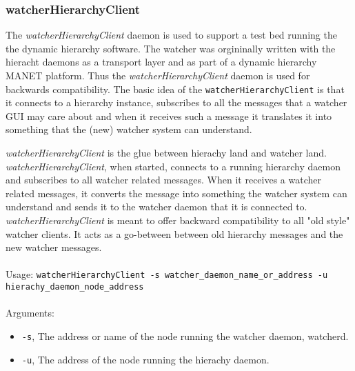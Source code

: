 \subsubsection{watcherHierarchyClient}
\label{watcherHierarchyClient}

The {\it watcherHierarchyClient} daemon is used to support a test bed running the the dynamic hierarchy software. 
The watcher was orgininally written with the hieracht daemons as a transport layer and as part of a 
dynamic hierarchy MANET platform. Thus the {\it watcherHierarchyClient} daemon is used for backwards compatibility. 
The basic idea of the {\tt watcherHierarchyClient} is that it connects to a hierarchy instance, subscribes
to all the messages that a watcher GUI may care about and when it receives such a message it translates it 
into something that the (new) watcher system can understand. 

{\it watcherHierarchyClient} is the glue between hierachy land and watcher land. {\it watcherHierarchyClient}, when started, connects
to a running hierarchy daemon and subscribes to all watcher related messages. When it receives a watcher related
messages, it converts the message into something the watcher system can understand and sends it to the watcher daemon
that it is connected to. {\it watcherHierarchyClient} is meant to offer backward compatibility to all "old style" watcher 
clients. It acts as a go-between between old hierarchy messages and the new watcher messages.
\\\\
Usage:
{\tt watcherHierarchyClient -s watcher\_daemon\_name\_or\_address -u hierachy\_daemon\_node\_address}
\\\\
Arguments:
\begin{itemize}
\item {\tt -s}, The address or name of the node running the watcher daemon, watcherd.
\item {\tt -u}, The address of the node running the hierachy daemon.
\end{itemize}

